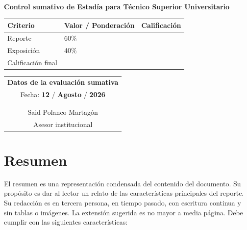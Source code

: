 \documentclass[12pt]{article}
\newcommand{\nasesorinstitucional}{Said Polanco Martagón}
\newcommand{\DiaEvaluacionPesentacion}{12}
\newcommand{\MesEvaluacionPesentacion}{Agosto}
\newcommand{\AnhoEvaluacionPesentacion}{2026}
\begin{document}
\clearpage
{}

\vspace*{3cm}

\begin{center}
{\large \textbf{Control sumativo de Estadía para Técnico Superior Universitario}}
\end{center}

\vspace{0.5cm}

\begin{center}
\begin{tabular}{|p{6cm}|p{4cm}|p{4cm}|}
\hline
\textbf{Criterio} & \textbf{Valor / Ponderación} & \textbf{Calificación} \\ \hline
Reporte & 60\% & \\ \hline
Exposición & 40\% & \\ \hline
Calificación final & \multicolumn{2}{c|}{ } \\ \hline
\end{tabular}
\end{center}

\vspace{0.8cm}

\begin{center}
\begin{tabular}{|p{10cm}|}
\hline
\multicolumn{1}{|c|}{\textbf{Datos de la evaluación sumativa}}\\
\multicolumn{1}{|c|}{Fecha: \textbf{\DiaEvaluacionPesentacion} / \textbf{\MesEvaluacionPesentacion} / \textbf{\AnhoEvaluacionPesentacion}} \\ \hline
 \\
 \\ \hline
\multicolumn{1}{c}{\nasesorinstitucional} \\
\multicolumn{1}{c}{Asesor institucional} \\
\end{tabular}
\end{center}

\clearpage
\ClearWallPaper
\thispagestyle{fancy}
\section*{Resumen}

El resumen es una representación condensada del contenido del documento. Su propósito es dar al lector un relato de las características principales del reporte. Su redacción es en tercera persona, en tiempo pasado, con escritura continua y sin tablas o imágenes. La extensión sugerida es no mayor a media página. Debe cumplir con las siguientes características:
\end{document}
